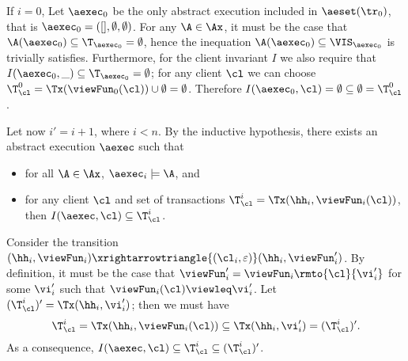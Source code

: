 If $i = 0$, Let $\aexec_{0}$ be the only abstract execution included in $\aeset(\tr_{0})$, 
that is $\aexec_{0} = ([], \emptyset, \emptyset)$. For any $\A \in \Ax$, it must be the case that 
$\A(\aexec_{0}) \subseteq \T_{\aexec_{0}} = \emptyset$, hence the inequation $\A(\aexec_{0}) \subseteq \VIS_{\aexec_{0}}$ 
is trivially satisfies. Furthermore, for the client invariant $I$ we also require that $I(\aexec_{0}, \_) \subseteq \T_{\aexec_{0}} = \emptyset$; 
for any client $\cl$ we can choose $\T_{\cl}^{0} = \Tx(\viewFun_{0}(\cl)) \cup \emptyset = \emptyset$. Therefore 
$I(\aexec_{0}, \cl) = \emptyset \subseteq \emptyset = \T_{\cl}^{0}$.

Let now $i' = i + 1$, where $i < n$.
By the inductive hypothesis, there exists an abstract execution $\aexec$ such that  
\begin{itemize}
\item for all $\A \in \Ax$, $\aexec_{i} \models \A$, and 
\item for any client $\cl$ and set of transactions $\T_{\cl}^{i} = \Tx(\hh_{i}, \viewFun_{i}(\cl))$, 
then $I(\aexec, \cl) \subseteq \T_{\cl}^{i}$.
\end{itemize}
Consider the transition $(\hh_{i}, \viewFun_{i}) \xrightarrowtriangle{(\cl_{i}, \varepsilon)} (\hh_{i}, \viewFun'_{i})$. 
By definition, it must be the case that $\viewFun'_{i} = \viewFun_{i}\rmto{\cl}{\vi'_{i}}$ 
for some $\vi'_{i}$ such that $\viewFun_{i}(\cl) \viewleq \vi'_{i}$.
Let $(\T_{\cl}^{i})' = \Tx(\hh_{i}, \vi'_{i})$; then we must have 
\[
\T_{\cl}^{i} = \Tx(\hh_{i}, \viewFun_{i}(\cl)) \subseteq \Tx(\hh_{i}, \vi'_{i}) = (\T_{\cl}^{i})'. 
\]
As a consequence, $I(\aexec, \cl) \subseteq \T_{\cl}^{i} \subseteq (\T_{\cl}^{i})'$.

